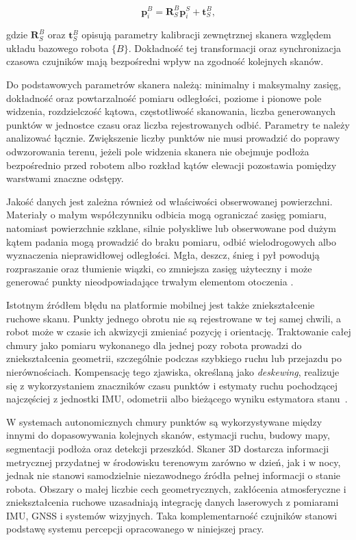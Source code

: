 \documentclass[a4paper,twoside,12pt]{book}
\begin{document}
\begin{equation}
    \mathbf{p}^{B}_i = \mathbf{R}^{B}_{S}\mathbf{p}^{S}_i + \mathbf{t}^{B}_{S},
    \label{eq:lidar_extrinsic_transform}
\end{equation}

gdzie $\mathbf{R}^{B}_{S}$ oraz $\mathbf{t}^{B}_{S}$ opisują parametry kalibracji zewnętrznej skanera względem układu bazowego robota $\{B\}$. Dokładność tej transformacji oraz synchronizacja czasowa czujników mają bezpośredni wpływ na zgodność kolejnych skanów.

Do podstawowych parametrów skanera należą: minimalny i maksymalny zasięg, dokładność oraz powtarzalność pomiaru odległości, poziome i pionowe pole widzenia, rozdzielczość kątowa, częstotliwość skanowania, liczba generowanych punktów w jednostce czasu oraz liczba rejestrowanych odbić. Parametry te należy analizować łącznie. Zwiększenie liczby punktów nie musi prowadzić do poprawy odwzorowania terenu, jeżeli pole widzenia skanera nie obejmuje podłoża bezpośrednio przed robotem albo rozkład kątów elewacji pozostawia pomiędzy warstwami znaczne odstępy.

Jakość danych jest zależna również od właściwości obserwowanej powierzchni. Materiały o małym współczynniku odbicia mogą ograniczać zasięg pomiaru, natomiast powierzchnie szklane, silnie połyskliwe lub obserwowane pod dużym kątem padania mogą prowadzić do braku pomiaru, odbić wielodrogowych albo wyznaczenia nieprawidłowej odległości. Mgła, deszcz, śnieg i pył powodują rozpraszanie oraz tłumienie wiązki, co zmniejsza zasięg użyteczny i może generować punkty nieodpowiadające trwałym elementom otoczenia \cite{rasshofer2011weather}.

Istotnym źródłem błędu na platformie mobilnej jest także zniekształcenie ruchowe skanu. Punkty jednego obrotu nie są rejestrowane w tej samej chwili, a robot może w czasie ich akwizycji zmieniać pozycję i orientację. Traktowanie całej chmury jako pomiaru wykonanego dla jednej pozy robota prowadzi do zniekształcenia geometrii, szczególnie podczas szybkiego ruchu lub przejazdu po nierównościach. Kompensację tego zjawiska, określaną jako \textit{deskewing}, realizuje się z wykorzystaniem znaczników czasu punktów i estymaty ruchu pochodzącej najczęściej z jednostki IMU, odometrii albo bieżącego wyniku estymatora stanu~\cite{motion_deskewing_lidar}.

W systemach autonomicznych chmury punktów są wykorzystywane między innymi do dopasowywania kolejnych skanów, estymacji ruchu, budowy mapy, segmentacji podłoża oraz detekcji przeszkód. Skaner 3D dostarcza informacji metrycznej przydatnej w środowisku terenowym zarówno w dzień, jak i w nocy, jednak nie stanowi samodzielnie niezawodnego źródła pełnej informacji o stanie robota. Obszary o małej liczbie cech geometrycznych, zakłócenia atmosferyczne i zniekształcenia ruchowe uzasadniają integrację danych laserowych z pomiarami IMU, GNSS i systemów wizyjnych. Taka komplementarność czujników stanowi podstawę systemu percepcji opracowanego w niniejszej pracy.
\end{document}
